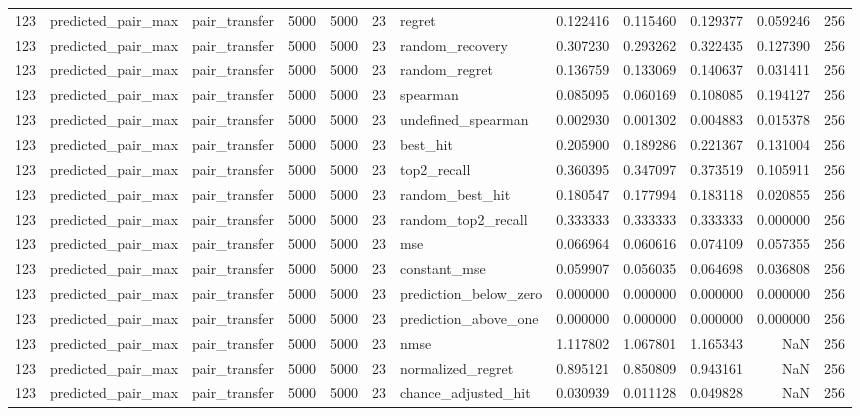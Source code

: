 \begin{tabular}{rllrrrlrrrrr}
123 & predicted_pair_max & pair_transfer & 5000 & 5000 & 23 & regret & 0.122416 & 0.115460 & 0.129377 & 0.059246 & 256 \\
123 & predicted_pair_max & pair_transfer & 5000 & 5000 & 23 & random_recovery & 0.307230 & 0.293262 & 0.322435 & 0.127390 & 256 \\
123 & predicted_pair_max & pair_transfer & 5000 & 5000 & 23 & random_regret & 0.136759 & 0.133069 & 0.140637 & 0.031411 & 256 \\
123 & predicted_pair_max & pair_transfer & 5000 & 5000 & 23 & spearman & 0.085095 & 0.060169 & 0.108085 & 0.194127 & 256 \\
123 & predicted_pair_max & pair_transfer & 5000 & 5000 & 23 & undefined_spearman & 0.002930 & 0.001302 & 0.004883 & 0.015378 & 256 \\
123 & predicted_pair_max & pair_transfer & 5000 & 5000 & 23 & best_hit & 0.205900 & 0.189286 & 0.221367 & 0.131004 & 256 \\
123 & predicted_pair_max & pair_transfer & 5000 & 5000 & 23 & top2_recall & 0.360395 & 0.347097 & 0.373519 & 0.105911 & 256 \\
123 & predicted_pair_max & pair_transfer & 5000 & 5000 & 23 & random_best_hit & 0.180547 & 0.177994 & 0.183118 & 0.020855 & 256 \\
123 & predicted_pair_max & pair_transfer & 5000 & 5000 & 23 & random_top2_recall & 0.333333 & 0.333333 & 0.333333 & 0.000000 & 256 \\
123 & predicted_pair_max & pair_transfer & 5000 & 5000 & 23 & mse & 0.066964 & 0.060616 & 0.074109 & 0.057355 & 256 \\
123 & predicted_pair_max & pair_transfer & 5000 & 5000 & 23 & constant_mse & 0.059907 & 0.056035 & 0.064698 & 0.036808 & 256 \\
123 & predicted_pair_max & pair_transfer & 5000 & 5000 & 23 & prediction_below_zero & 0.000000 & 0.000000 & 0.000000 & 0.000000 & 256 \\
123 & predicted_pair_max & pair_transfer & 5000 & 5000 & 23 & prediction_above_one & 0.000000 & 0.000000 & 0.000000 & 0.000000 & 256 \\
123 & predicted_pair_max & pair_transfer & 5000 & 5000 & 23 & nmse & 1.117802 & 1.067801 & 1.165343 & NaN & 256 \\
123 & predicted_pair_max & pair_transfer & 5000 & 5000 & 23 & normalized_regret & 0.895121 & 0.850809 & 0.943161 & NaN & 256 \\
123 & predicted_pair_max & pair_transfer & 5000 & 5000 & 23 & chance_adjusted_hit & 0.030939 & 0.011128 & 0.049828 & NaN & 256 \\

\end{tabular}
